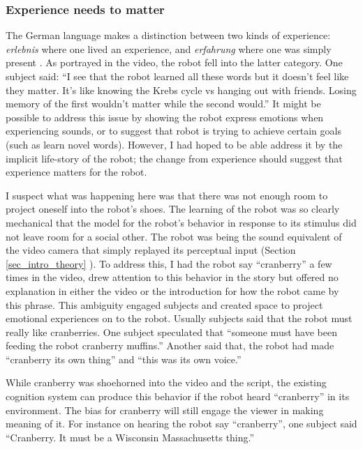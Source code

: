 \subsubsection{Experience needs to matter}

The German language makes a distinction between two kinds of experience: \emph{erlebnis} where one lived an experience, and \emph{erfahrung} where one was simply present \cite{glasersfeld_experience}. As portrayed in the video, the robot fell into the latter category. One subject said: ``I see that the robot learned all these words but it doesn't feel like they matter. It's like knowing the Krebs cycle vs hanging out with friends. Losing memory of the first wouldn't matter while the second would.'' It might be possible to address this issue by showing the robot express emotions when experiencing sounds, or to suggest that robot is trying to achieve certain goals (such as learn novel words). However, I had hoped to be able address it by the implicit life-story of the robot; the change from experience should suggest that experience matters for the robot. 

I suspect what was happening here was that there was not enough room to project oneself into the robot's shoes. The learning of the robot was so clearly mechanical that the model for the robot's behavior in response to its stimulus did not leave room for a social other. The robot was being the sound equivalent of the video camera that simply replayed its perceptual input (Section \ref{sec_intro_theory} ). To address this, I had the robot say ``cranberry'' a few times in the video, drew attention to this behavior in the story but offered no explanation in either the video or the introduction for how the robot came by this phrase. This ambiguity engaged subjects and created space to project emotional experiences on to the robot. Usually subjects said that the robot must really like cranberries. One subject speculated that ``someone must have been feeding the robot cranberry muffins.'' Another said that, the robot had made ``cranberry its own thing'' and ``this was its own voice.''

While cranberry was shoehorned into the video and the script, the existing cognition system can produce this behavior if the robot heard ``cranberry'' in its environment. The bias for cranberry will still engage the viewer in making meaning of it. For instance on hearing the robot say ``cranberry'', one subject said ``Cranberry. It must be a Wisconsin Massachusetts thing.'' 

